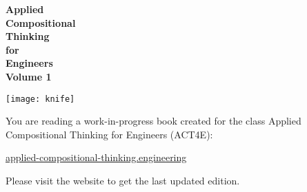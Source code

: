 
\begin{center}

    \vspace{3cm}
    {\huge\bfseries Applied\\Compositional\\Thinking \\[3mm]for\\[1mm] Engineers\\[1cm]Volume 1}


\end{center}

\vspace{3cm}
\begin{center}
    \texttt{[image: knife]}
\end{center}


\vfill

You are reading a work-in-progress book created for the
class Applied Compositional Thinking for Engineers (ACT4E):

\href{https://applied-compositional-thinking.engineering}{applied-compositional-thinking.engineering}

Please visit the website to get the last updated edition.
